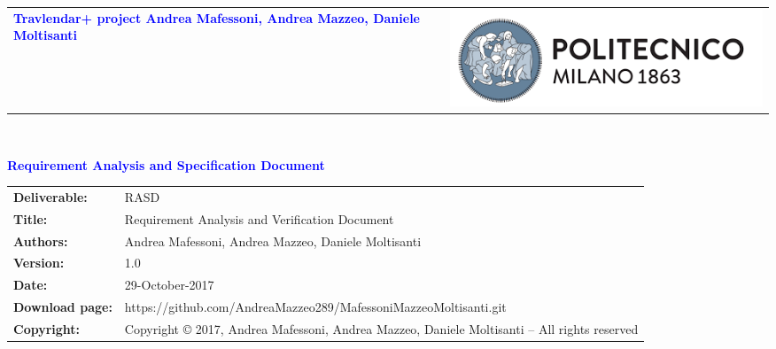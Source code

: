 
\usepackage{graphicx}
\usepackage{listings}
\renewcommand\textfraction{.1}

	
	
	\begin{titlepage}
		
		
		
		{\begin{table}[t!]
				\centering
				\begin{tabu} to \textwidth { X[1.3,r,p] X[1.7,l,p] }
					\textcolor{Blue}
					{\textbf{\small{Travlendar+ project Andrea Mafessoni, Andrea Mazzeo, Daniele Moltisanti}}} & \includegraphics[scale=0.5]{Images/PolimiLogo}
				\end{tabu}
		\end{table}}~\\ [7cm]
		
		
		\begin{flushleft}
			
			{\textcolor{Blue}{\textbf{\Huge{Requirement Analysis and Specification
							Document}}}} \\ [1cm]
			
		\end{flushleft}
		
	\end{titlepage}
	
	\begin{table}[h!]
		\begin{tabu} to \textwidth { X[0.3,r,p] X[0.7,l,p] }
			\hline
			
			\textbf{Deliverable:} & RASD\\
			\textbf{Title:} & Requirement Analysis and Verification Document \\
			\textbf{Authors:} & Andrea Mafessoni, Andrea Mazzeo, Daniele Moltisanti \\
			\textbf{Version:} & 1.0 \\ 
			\textbf{Date:} & 29-October-2017 \\
			\textbf{Download page:} & https://github.com/AndreaMazzeo289/MafessoniMazzeoMoltisanti.git \\
			\textbf{Copyright:} & Copyright © 2017, Andrea Mafessoni, Andrea Mazzeo, Daniele Moltisanti – All rights reserved \\
			\hline
		\end{tabu}
	\end{table}
	
